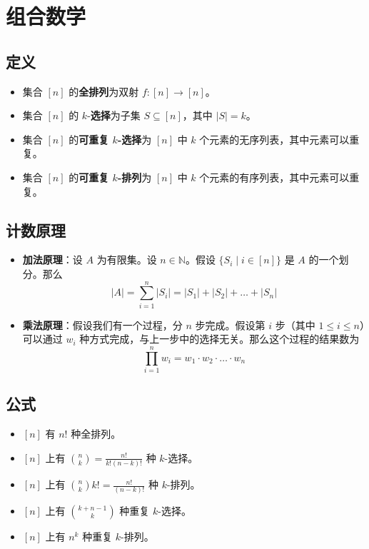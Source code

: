 \section{组合数学}

\subsection{定义}

\begin{itemize}
    \item 集合 $[n]$ 的\textbf{全排列}为双射 $f : [n] \to [n]$。
    \item 集合 $[n]$ 的 $k$-\textbf{选择}为子集 $S \subseteq [n]$，其中 $|S| = k$。
    \item 集合 $[n]$ 的\textbf{可重复 $k$-选择}为 $[n]$ 中 $k$ 个元素的无序列表，其中元素可以重复。
    \item 集合 $[n]$ 的\textbf{可重复 $k$-排列}为 $[n]$ 中 $k$ 个元素的有序列表，其中元素可以重复。
\end{itemize}

\subsection{计数原理}

\begin{itemize}
    \item \textbf{加法原理}：设 $A$ 为有限集。设 $n \in \mathbb{N}$。假设 $\{S_i \mid i \in [n]\}$ 是 $A$ 的一个划分。那么
          \[|A| = \sum_{i=1}^n |S_i| = |S_1| + |S_2| + \dots + |S_n|\]
    \item \textbf{乘法原理}：假设我们有一个过程，分 $n$ 步完成。假设第 $i$ 步（其中 $1 \le i \le n$）可以通过 $w_i$ 种方式完成，与上一步中的选择无关。那么这个过程的结果数为
          \[\prod_{i=1}^n w_i = w_1 \cdot w_2 \cdot\dots\cdot w_n\]
\end{itemize}


\subsection{公式}

\begin{itemize}
    \item $[n]$ 有 $n!$ 种全排列。
    \item $[n]$ 上有 ${n \choose k} = \frac{n!}{k!(n-k)!}$ 种 $k$-选择。
    \item $[n]$ 上有 ${n \choose k}k! = \frac{n!}{(n-k)!}$ 种 $k$-排列。
    \item $[n]$ 上有 ${k+n-1 \choose k}$ 种重复 $k$-选择。
    \item $[n]$ 上有 $n^k$ 种重复 $k$-排列。
\end{itemize}

